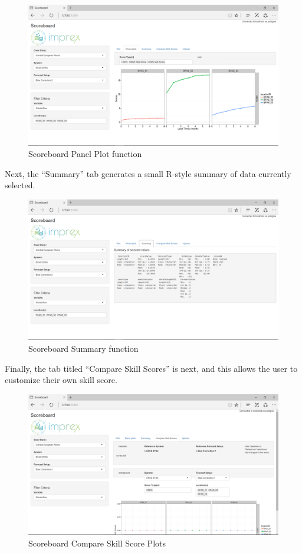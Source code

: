 \documentclass[logos,parttoc,morelanguage=french,morelanguage=german]{orsay-memoire}
\begin{document}
\begin{figure}[hb]
\centering
  \includegraphics[width=0.85\linewidth]{images/isb2.png}
  \caption{Scoreboard Panel Plot function}
  \label{fig:isb2}
\end{figure}

Next, the ``Summary'' tab generates a small R-style summary of data currently selected. 

\begin{figure}[hb]
\centering
\includegraphics[width=0.80\linewidth]{images/isb3.png}
  \caption{Scoreboard Summary function}
  \label{fig:isb3}
\end{figure}

Finally, the tab titled ``Compare Skill Scores'' is next, and this allows the user to customize their own skill score.

\begin{figure}[H]
\centering
\includegraphics[width=0.80\linewidth]{images/isb4.png}
  \caption{Scoreboard Compare Skill Score Plots}
  \label{fig:isb4}
\end{figure}
\end{document}
